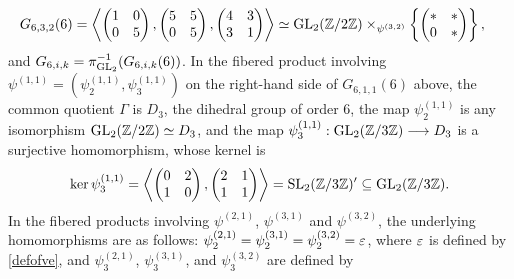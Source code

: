 \begin{equation}
\begin{split}
G_{6,3,2}(6) &= \left\langle \begin{pmatrix} 1 & 0 \\ 0 & 5 \end{pmatrix}, \begin{pmatrix} 5 & 5 \\ 0 & 5 \end{pmatrix}, \begin{pmatrix} 4 & 3 \\ 3 & 1 \end{pmatrix} \right\rangle \simeq \operatorname{GL}_2(\mathbb{Z}/2\mathbb{Z}) \times_{\psi^{(3,2)}} \left\{ \begin{pmatrix} * & * \\ 0 & * \end{pmatrix} \right\},
\end{split}
\end{equation}
and $G_{6,i,k} = \pi_{\operatorname{GL}_2}^{-1}(G_{6,i,k}(6))$. In the fibered product involving $\psi^{(1,1)} = (\psi_2^{(1,1)},\psi_3^{(1,1)})$ on the right-hand side of $G_{6,1,1}(6)$ above, the common quotient $\Gamma$ is $D_3$, the dihedral group of order $6$, the map $\psi_2^{(1,1)}$ is any isomorphism $\operatorname{GL}_2(\mathbb{Z}/2\mathbb{Z}) \simeq D_3$, and the map $\psi_3^{(1,1)} : \operatorname{GL}_2(\mathbb{Z}/3\mathbb{Z}) \longrightarrow D_3$ is a surjective homomorphism, whose kernel is
\[
\ker \psi_3^{(1,1)} = \left\langle \begin{pmatrix} 0 & 2 \\ 1 & 0 \end{pmatrix}, \begin{pmatrix} 2 & 1 \\ 1 & 1 \end{pmatrix} \right\rangle = \operatorname{SL}_2(\mathbb{Z}/3\mathbb{Z})' \subseteq \operatorname{GL}_2(\mathbb{Z}/3\mathbb{Z}).
\]
In the fibered products involving $\psi^{(2,1)}$, $\psi^{(3,1)}$ and $\psi^{(3,2)}$, the underlying homomorphisms are as follows: $\psi_2^{(2,1)} = \psi_2^{(3,1)} = \psi_2^{(3,2)} = \varepsilon$, where $\varepsilon$ is defined by \eqref{defofve}, and $\psi_3^{(2,1)}$, $\psi_3^{(3,1)}$, and $\psi_3^{(3,2)}$ are defined by
